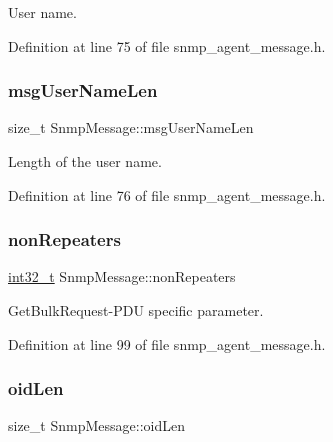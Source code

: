 User name. 



Definition at line 75 of file snmp\+\_\+agent\+\_\+message.\+h.

\mbox{\label{structSnmpMessage_ac9a168d33bda6c99336def2b01440b3b}} 
\subsubsection{\texorpdfstring{msg\+User\+Name\+Len}{msgUserNameLen}}
{\footnotesize\ttfamily size\+\_\+t Snmp\+Message\+::msg\+User\+Name\+Len}



Length of the user name. 



Definition at line 76 of file snmp\+\_\+agent\+\_\+message.\+h.

\mbox{\label{structSnmpMessage_a636216d602b0d25cd83d25b42f828105}} 
\subsubsection{\texorpdfstring{non\+Repeaters}{nonRepeaters}}
{\footnotesize\ttfamily \hyperlink{stdint_8h_ab1967d8591af1a4e48c37fd2b0f184d0}{int32\+\_\+t} Snmp\+Message\+::non\+Repeaters}



Get\+Bulk\+Request-\/\+P\+DU specific parameter. 



Definition at line 99 of file snmp\+\_\+agent\+\_\+message.\+h.

\mbox{\label{structSnmpMessage_a91aaa1028c1cec2114812bec3ba91e2e}} 
\subsubsection{\texorpdfstring{oid\+Len}{oidLen}}
{\footnotesize\ttfamily size\+\_\+t Snmp\+Message\+::oid\+Len}



